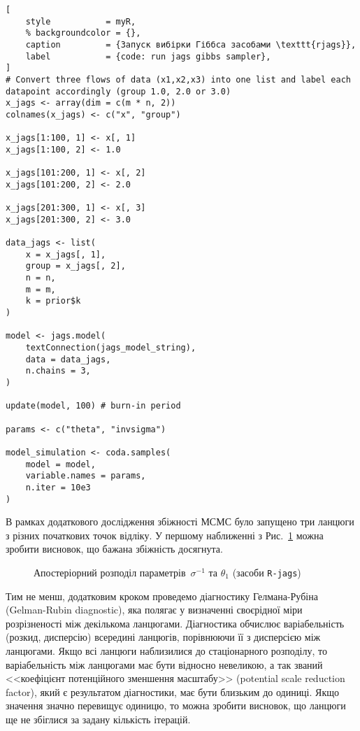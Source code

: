 \vspace{0.4cm}
\begin{lstlisting}[
    style           = myR, 
    % backgroundcolor = {},
    caption         = {Запуск вибірки Гіббса засобами \texttt{rjags}},
    label           = {code: run jags gibbs sampler},
]
# Convert three flows of data (x1,x2,x3) into one list and label each datapoint accordingly (group 1.0, 2.0 or 3.0)
x_jags <- array(dim = c(m * n, 2))
colnames(x_jags) <- c("x", "group")

x_jags[1:100, 1] <- x[, 1]
x_jags[1:100, 2] <- 1.0

x_jags[101:200, 1] <- x[, 2]
x_jags[101:200, 2] <- 2.0

x_jags[201:300, 1] <- x[, 3]
x_jags[201:300, 2] <- 3.0

data_jags <- list(
    x = x_jags[, 1],
    group = x_jags[, 2],
    n = n,
    m = m,
    k = prior$k
)

model <- jags.model(
    textConnection(jags_model_string),
    data = data_jags,
    n.chains = 3,
)

update(model, 100) # burn-in period

params <- c("theta", "invsigma")

model_simulation <- coda.samples(
    model = model,
    variable.names = params,
    n.iter = 10e3
)
\end{lstlisting}

\vspace{0.4cm}

\newpage
В рамках додаткового дослідження збіжності МСМС було запущено три ланцюги з різних початкових точок відліку. У першому наближенні з Рис.~\ref{pic: jags Gibbs Sampler traceplot} можна зробити висновок, що бажана збіжність досягнута. 

\vspace{0.4cm}
\begin{figure}[H]\centering
    \caption{Апостеріорний розподіл параметрів~$\sigma^{-1}$ та $\theta_1$ (засоби \texttt{R-jags})}
    \label{pic: jags Gibbs Sampler traceplot}
\end{figure}

Тим не менш, додатковим кроком проведемо діагностику Гелмана-Рубіна (Gelman-Rubin diagnostic), яка полягає у визначенні своєрідної міри розрізненості між декількома ланцюгами. Діагностика обчислює варіабельність (розкид, дисперсію) всередині ланцюгів, порівнюючи її з дисперсією між ланцюгами. Якщо всі ланцюги наблизилися до стаціонарного розподілу, то варіабельність між ланцюгами має бути відносно невеликою, а так званий <<коефіцієнт потенційного зменшення масштабу>> (potential scale reduction factor), який є результатом діагностики, має бути близьким до одиниці. Якщо значення значно перевищує одиницю, то можна зробити висновок, що ланцюги ще не збіглися за задану кількість ітерацій.


